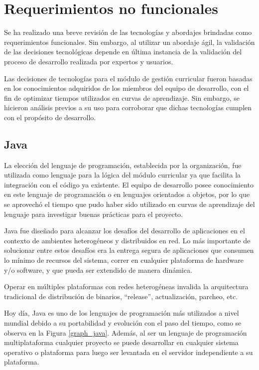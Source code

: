 \section{Requerimientos no funcionales} \label{reqnofuncional}
Se ha realizado una breve revisión de las tecnologías y abordajes brindadas como requerimientos funcionales. Sin embargo, al utilizar un abordaje ágil, la validación de las decisiones tecnológicas depende en última instancia de la validación del proceso de desarrollo realizada por expertos y usuarios.

Las decisiones de tecnologías para el módulo de gestión curricular fueron basadas en los conocimientos adquiridos de los miembros del equipo de desarrollo, con el fin de optimizar tiempos utilizados en curvas de aprendizaje. Sin embargo, se hicieron análisis previos a su uso para corroborar que dichas tecnologías cumplen con el propósito de desarrollo.

\subsection{Java}
La elección del lenguaje de programación, establecida por la organización, fue utilizada como lenguaje para la lógica del módulo curricular ya que facilita la integración con el código ya existente. El equipo de desarrollo posee conocimiento en este lenguaje de programación o en lenguajes orientados a objetos, por lo que se aprovechó el tiempo que pudo haber sido utilizado en curvas de aprendizaje del lenguaje para investigar buenas prácticas para el proyecto.

Java fue diseñado para alcanzar los desafíos del desarrollo de aplicaciones en el contexto de ambientes heterogéneos y distribuidos en red\citep{eckel_thinking_2006}. Lo más importante de solucionar entre estos desafíos era la entrega segura de aplicaciones que consumen lo mínimo de recursos del sistema, correr en cualquier plataforma de hardware y/o software, y que pueda ser extendido de manera dinámica\citep{sierra2005head}.

Operar en múltiples plataformas con redes heterogéneas invalida la arquitectura tradicional de distribución de binarios, \enquote{release}, actualización, parcheo, etc\citep{arnold2005java}.

Hoy día, Java es uno de los lenguajes de programación más utilizados a nivel mundial debido a su portabilidad y evolución con el paso del tiempo, como se observa en la Figura \ref{graph_java}. Además, al ser un lenguaje de programación multiplataforma cualquier proyecto se puede desarrollar en cualquier sistema operativo o plataforma para luego ser levantada en el servidor independiente a su plataforma. 

